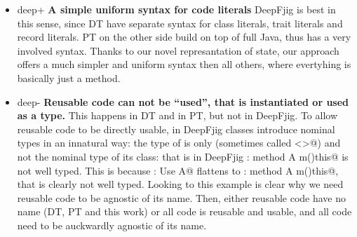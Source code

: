 \begin{itemize}
\item deep+ {\bf A simple uniform syntax for code literals}
DeepFjig is best in this sense, since DT have separate syntax for class literals, trait literals and record literals.
PT on the other side build on top of full Java, thus has a very involved syntax.
Thanks to our novel represantation of state, our approach offers a much simpler and uniform syntax then
all others, where evertyhing is basically just a method.
\item deep-
{\bf Reusable code can not be ``used'', that is instantiated or used as a type.}
This happens in DT and in PT, but not in DeepFjig. To allow reusable code to be directly 
usable, in DeepFjig
classes introduce nominal types in an innatural way: the type of \Q@this@ is only \Q@This@ (sometimes called \Q@<>@) and not the nominal type of its class: that is in DeepFjig 
\Q@A:{ method A m()this}@ is not well typed. This is because
\Q@B: Use A@ flattens to \Q@B:{ method A m()this}@, that is clearly not well typed.
Looking to this example is clear why we need reusable code to be agnostic of its name.
Then, either reusable code have no name (DT, PT and this work)
or all code is reusable and usable, and all code need to be auckwardly agnostic of its name.


\end{itemize}
